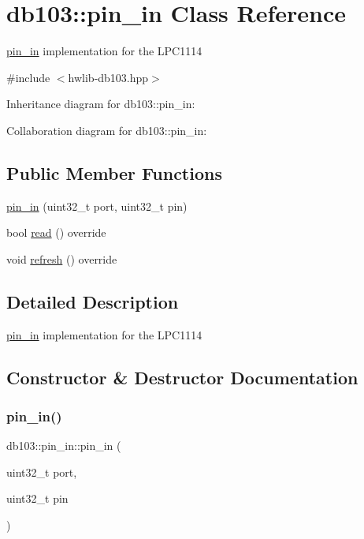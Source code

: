 \hypertarget{classdb103_1_1pin__in}{}\section{db103\+:\+:pin\+\_\+in Class Reference}
\label{classdb103_1_1pin__in}


\hyperlink{classdb103_1_1pin__in}{pin\+\_\+in} implementation for the L\+P\+C1114  




{\ttfamily \#include $<$hwlib-\/db103.\+hpp$>$}



Inheritance diagram for db103\+:\+:pin\+\_\+in\+:


Collaboration diagram for db103\+:\+:pin\+\_\+in\+:
\subsection*{Public Member Functions}
\begin{DoxyCompactItemize}
\item 
\hyperlink{classdb103_1_1pin__in_ab58ed3517fb138173421fed3e7466b05}{pin\+\_\+in} (uint32\+\_\+t port, uint32\+\_\+t pin)
\item 
bool \hyperlink{classdb103_1_1pin__in_aa45255f1a10bf9496f165e591d5cb329}{read} () override
\item 
void \hyperlink{classdb103_1_1pin__in_a7581d464f903d09f945b595b3c0f9163}{refresh} () override
\end{DoxyCompactItemize}


\subsection{Detailed Description}
\hyperlink{classdb103_1_1pin__in}{pin\+\_\+in} implementation for the L\+P\+C1114 

\subsection{Constructor \& Destructor Documentation}
\mbox{\label{classdb103_1_1pin__in_ab58ed3517fb138173421fed3e7466b05}} 
\subsubsection{\texorpdfstring{pin\+\_\+in()}{pin\_in()}}
{\footnotesize\ttfamily db103\+::pin\+\_\+in\+::pin\+\_\+in (\begin{DoxyParamCaption}\item[{uint32\+\_\+t}]{port,  }\item[{uint32\+\_\+t}]{pin }\end{DoxyParamCaption})\hspace{0.3cm}{\ttfamily [inline]}}


